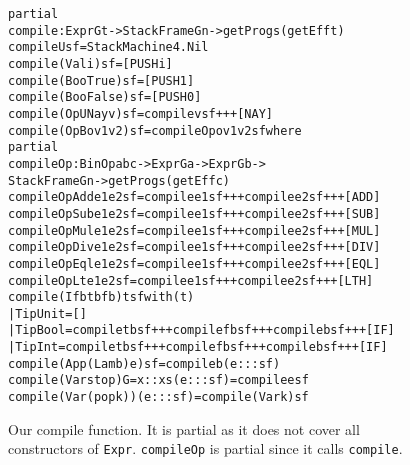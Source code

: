 \begin{figure}
\begin{alltt}
partial
compile : Expr G t -> StackFrame G n -> getProg s (getEff t)
compile U                 sf    = StackMachine4.Nil
compile (Val i)           sf    = [PUSH i]
compile (Boo True)        sf    = [PUSH 1]
compile (Boo False)       sf    = [PUSH 0]
compile (OpU Nay v)       sf    = compile v sf +++ [NAY]
compile (OpB o v1 v2) sf = compileOp o v1 v2 sf where
  partial 
  compileOp : BinOp a b c -> Expr G a -> Expr G b -> 
                StackFrame G n -> getProg s (getEff c)
  compileOp Add e1 e2 sf = compile e1 sf +++ compile e2 sf +++ [ADD]
  compileOp Sub e1 e2 sf = compile e1 sf +++ compile e2 sf +++ [SUB]
  compileOp Mul e1 e2 sf = compile e1 sf +++ compile e2 sf +++ [MUL]
  compileOp Div e1 e2 sf = compile e1 sf +++ compile e2 sf +++ [DIV]
  compileOp Eql e1 e2 sf = compile e1 sf +++ compile e2 sf +++ [EQL]
  compileOp Lt  e1 e2 sf = compile e1 sf +++ compile e2 sf +++ [LTH]
compile (If b tb fb) {t} sf with (t)
  | TipUnit = []
  | TipBool = compile tb sf +++ compile fb sf +++ compile b  sf +++ [IF]
  | TipInt  = compile tb sf +++ compile fb sf +++ compile b  sf +++ [IF]
compile (App (Lam b) e) sf = compile b (e ::: sf)
compile (Var stop) {G = x :: xs} (e ::: sf) = compile e sf
compile (Var (pop k)) (e ::: sf) = compile (Var k) sf
\end{alltt}
\label{fig:compile_function}
\caption{Our compile function. It is partial as it does not cover all constructors of \texttt{Expr}. \texttt{compileOp} is partial since it calls \texttt{compile}.}
\end{figure}